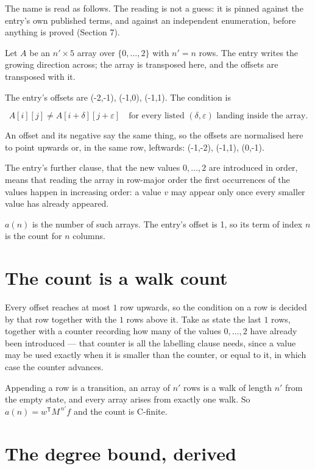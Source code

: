 \documentclass[11pt]{article}
\theoremstyle{definition}
\begin{document}
The name is read as follows. The reading is not a guess: it is pinned against the entry's own published terms, and against an independent enumeration, before anything is proved (Section 7).

Let $A$ be an $n' \times 5$ array over $\{0,\dots,2\}$ with $n' = n$ rows. The entry writes the growing direction across; the array is transposed here, and the offsets are transposed with it.

The entry's offsets are (-2,-1), (-1,0), (-1,1). The condition is

\[A[i][j] \ne A[i{+}\delta][j{+}\varepsilon]\quad\text{for every listed }(\delta,\varepsilon)\text{ landing inside the array.}\]

An offset and its negative say the same thing, so the offsets are normalised here to point upwards or, in the same row, leftwards: (-1,-2), (-1,1), (0,-1).

The entry's further clause, that the new values $0,\dots,2$ are introduced in order, means that reading the array in row-major order the first occurrences of the values happen in increasing order: a value $v$ may appear only once every smaller value has already appeared.

$a(n)$ is the number of such arrays. The entry's offset is 1, so its term of index $n$ is the count for $n$ columns.

\section{The count is a walk count}

Every offset reaches at most $1$ row upwards, so the condition on a row is decided by that row together with the $1$ rows above it. Take as state the last $1$ rows, together with a counter recording how many of the values $0,\dots,2$ have already been introduced --- that counter is all the labelling clause needs, since a value may be used exactly when it is smaller than the counter, or equal to it, in which case the counter advances.

Appending a row is a transition, an array of $n'$ rows is a walk of length $n'$ from the empty state, and every array arises from exactly one walk. So $a(n) = w^{\mathsf T}M^{\,n'}f$ and the count is C-finite.

\section{The degree bound, derived}
\end{document}
